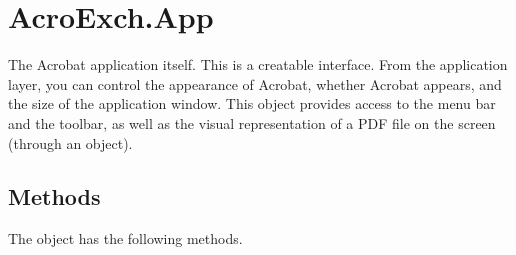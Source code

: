 \documentclass[letterpaper,12pt,english,openany,oneside]{sphinxmanual}
\begin{document}
\section{AcroExch.App}
\label{\detokenize{IAC_API_OLE_Objects:acroexch-app}}
The Acrobat application itself. This is a creatable interface. From the application layer, you can control the appearance of Acrobat, whether Acrobat appears, and the size of the application window. This object provides access to the menu bar and the toolbar, as well as the visual representation of a PDF file on the screen (through an  object).


\subsection{Methods}
\label{\detokenize{IAC_API_OLE_Objects:methods}}
The  object has the following methods.
\end{document}
